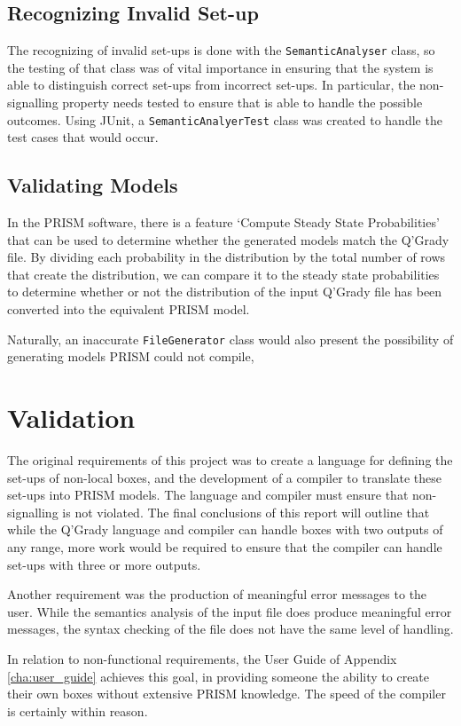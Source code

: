 \documentclass[report.tex]{subfiles}
\begin{document}
\subsection{Recognizing Invalid Set-up} %
\label{sub:recognizing_invalid_set_up}
The recognizing of invalid set-ups is done with the \texttt{SemanticAnalyser}
class, so the testing of that class was of vital importance in ensuring that
the system is able to distinguish correct set-ups from incorrect set-ups. In
particular, the non-signalling property needs tested to ensure that is able to
handle the possible outcomes. Using JUnit, a \texttt{SemanticAnalyerTest} class
was created to handle the test cases that would occur.


\subsection{Validating Models} %
\label{sub:validating_models}
In the PRISM software, there is a feature `Compute Steady State Probabilities'
that can be used to determine whether the generated models match the Q'Grady
file. By dividing each probability in the distribution by the total number of
rows that create the distribution, we can compare it to the steady state
probabilities to determine whether or not the distribution of the input Q'Grady
file has been converted into the equivalent PRISM model.

Naturally, an inaccurate \texttt{FileGenerator} class would also present the
possibility of generating models PRISM could not compile, 

\section{Validation} %
\label{sec:validation}
The original requirements of this project was to create a language for defining
the set-ups of non-local boxes, and the development of a compiler to translate
these set-ups into PRISM models. The language and compiler must ensure that
non-signalling is not violated. The final conclusions of this report will
outline that while the Q'Grady language and compiler can handle boxes with two
outputs of any range, more work would be required to ensure that the compiler
can handle set-ups with three or more outputs.

Another requirement was the production of meaningful error messages to the user.
While the semantics analysis of the input file does produce meaningful error
messages, the syntax checking of the file does not have the same level of
handling.

In relation to non-functional requirements, the User Guide of Appendix
\ref{cha:user_guide} achieves this goal, in providing someone the ability to
create their own boxes without extensive PRISM knowledge. The speed of the
compiler is certainly within reason.
\newpage
\end{document}
